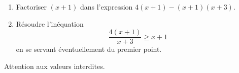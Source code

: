 
\begin{exercice}%
    \label{exosmath-0353}

    \begin{enumerate}
        \item
            Factoriser \( (x+1)\) dans l'expression \( 4(x+1)-(x+1)(x+3)\).
        \item
Résoudre l'inéquation
\begin{equation}
    \frac{ 4(x+1) }{ x+3 }\geq x+1
\end{equation}
en se servant éventuellement du premier point.
    \end{enumerate}
Attention aux valeurs interdites.

\end{exercice}
